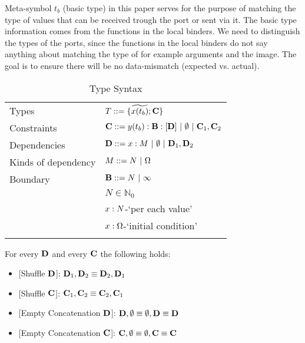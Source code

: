 Meta-symbol $t_b$ (basic type) in this paper serves for the purpose of matching the type of values that can be received trough the port or sent via it. The basic type information comes from the functions in the local binders. We need to distinguish the types of the ports, since the functions in the local binders do not say anything about matching the type of for example arguments and the image. The goal is to ensure there will be no data-mismatch (expected vs. actual).      

\vspace{0.5cm}
\begin{table}[t]
\centering
\begin{tabular}{l l}
   

Types  & $T::=\{\widetilde{x(t_b)};\textbf{C}\}$ 
\vspace{0.2cm}\\
Constraints & $\C::=\constr{y}{t_b}{\B}{\D} \ |\ \emptyset \ |\ \C_1,\C_2$
\vspace{0.2cm}\\

Dependencies & $\D::=\pev{x}{M}  \ |\ \emptyset \ |\ \D_1,\D_2$
\vspace{0.2cm}\\


Kinds of dependency & $M::=N\ |\ \ic$
\vspace{0.2cm}\\

Boundary & $\B::=N\ |\ \infty$
\vspace{0.2cm}\\

& $N\in \mathbb{N}_0$
\vspace{0.2cm}\\


& $x:N$-`per each value'
\vspace{0.2cm}\\

& $x:\Omega$-`initial condition'
\\
\\


\end{tabular}


 \caption{Type Syntax}
    \label{tab:typesyntax}
\end{table}


\begin{convention} For every $\textbf{D}$ and every $\textbf{C}$ the following holds:

\begin{itemize}
\item {[Shuffle $\textbf{D}$]}: $\textbf{D}_1,\textbf{D}_2\equiv\textbf{D}_2,\textbf{D}_1$
\item {[Shuffle $\textbf{C}$]}: $\textbf{C}_1,\textbf{C}_2\equiv\textbf{C}_2,\textbf{C}_1$
\item {[Empty Concatenation $\textbf{D}$]}:
$\textbf{D},\emptyset\equiv\emptyset,\textbf{D}\equiv\textbf{D}$
\item {[Empty Concatenation $\textbf{C}$]}: $\textbf{C},\emptyset\equiv\emptyset,\textbf{C}\equiv\textbf{C}$
\end{itemize}
\end{convention}




